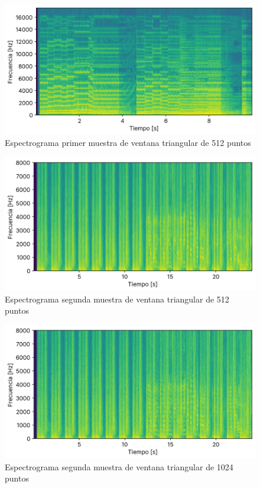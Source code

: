 \documentclass[12pt]{article}
\begin{document}
\begin{figure}[H]
\centering
\includegraphics{plot/cancion1_espectograma_bartlett_0512.png}
\caption{Espectrograma primer muestra de ventana triangular de 512 puntos}
\label{cancion1_espectograma_bartlett_0512}
\end{figure}

\begin{figure}[H]
\centering
\includegraphics{plot/cancion2_espectograma_bartlett_0512.png}
\caption{Espectrograma segunda muestra de ventana triangular de 512 puntos}
\label{cancion2_espectograma_bartlett_0512}
\end{figure}

\begin{figure}[H]
\centering
\includegraphics{plot/cancion2_espectograma_bartlett_1024.png}
\caption{Espectrograma segunda muestra de ventana triangular de 1024 puntos}
\label{cancion2_espectograma_bartlett_1024}
\end{figure}
\end{document}
